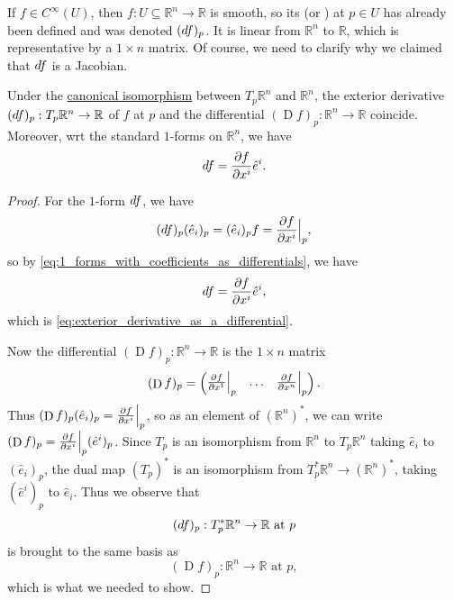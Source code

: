 \documentclass[notoc,notitlepage]{tufte-book}
\DeclareMathOperator{\D}{D}
\begin{document}
If $f \in C^\infty(U)$, then $f : U \subseteq \mathbb{R}^n \to \mathbb{R}$ is smooth, so its
 (or ) at  $p \in U$ has already been defined and was
denoted $(\mathop{}\!d{f})_p$. It is linear from $\mathbb{R}^n$ to $\mathbb{R}$, which is representative
by a $1 \times n$ matrix. Of course, we need to clarify why we claimed that $\mathop{}\!d{f}$ is a
Jacobian.

\begin{propo}\label{propo:exterior_derivative_as_the_jacobian}
  Under the \hyperref[propo:canonical_bijection_from_t_p_r_n_to_r_n_]{canonical isomorphism}
  between $T_p \mathbb{R}^n$ and $\mathbb{R}^n$, the exterior derivative $(\mathop{}\!d{f})_p :
  T_p \mathbb{R}^n \to \mathbb{R}$ of $f$ at $p$ and the differential $(\D f)_p : \mathbb{R}^n
  \to \mathbb{R}$ coincide. Moreover, wrt the standard $1$-forms on $\mathbb{R}^n$, we have
  \begin{equation}\label{eq:exterior_derivative_as_a_differential}
    \mathop{}\!d{f} = \frac{\partial f}{\partial x^i} \hat{e}^i.
  \end{equation}
\end{propo}

\begin{proof}
  For the $1$-form $\mathop{}\!d{f}$, we have
  \begin{equation*}
    (\mathop{}\!d{f})_p(\hat{e}_i)_p = (\hat{e}_i)_p f = \frac{\partial f}{\partial x^i} \Big|_{p}^{},
  \end{equation*}
  so by \cref{eq:1_forms_with_coefficients_as_differentials}, we have
  \begin{equation*}
    \mathop{}\!d{f} = \frac{\partial f}{\partial x^i} \hat{e}^i,
  \end{equation*}
  which is \cref{eq:exterior_derivative_as_a_differential}.

  Now the differential $(\D f)_p : \mathbb{R}^n \to \mathbb{R}$ is the $1 \times n$ matrix
  \begin{equation*}
    (\D f)_p = \begin{pmatrix}
      \frac{\partial f}{\partial x^1} \at{p}{} & \hdots & \frac{\partial f}{\partial x^n} \at{p}{}
    \end{pmatrix}.
  \end{equation*}
  Thus $(\D f)_p (\hat{e}_i)_p = \frac{\partial f}{\partial x^i} \at{p}{}$, so as an element of
  $(\mathbb{R}^n)^*$, we can write $(\D f)_p = \frac{\partial f}{\partial x^i}\at{p}{}
  (\hat{e}^i)_p$. Since $T_p$ is an isomorphism from $\mathbb{R}^n$ to $T_p \mathbb{R}^n$ taking
  $\hat{e}_i$ to $(\hat{e}_i)_p$, the dual map $(T_p)^*$ is an isomorphism from $T_p^* \mathbb{R}^n
  \to ( \mathbb{R}^n )^*$, taking $(\hat{e}^i)_p$ to $\hat{e}_i$. Thus we observe that
  \begin{equation*}
    (\mathop{}\!d{f})_p : T_p^* \mathbb{R}^n \to \mathbb{R} \text{ at } p
  \end{equation*}
  is brought to the same basis as
  \begin{equation*}
    (\D f)_p : \mathbb{R}^n \to \mathbb{R} \text{ at } p,
  \end{equation*}
  which is what we needed to show.
\end{proof}
\end{document}
